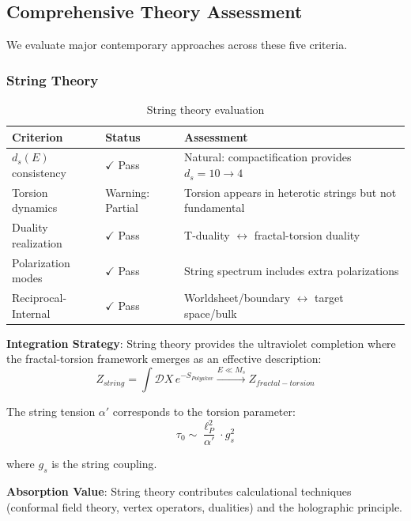 \subsection{Comprehensive Theory Assessment}

We evaluate major contemporary approaches across these five criteria.

\subsubsection{String Theory}

\begin{table}[h]
\centering
\begin{tabular}{p{3.5cm}p{2cm}p{6cm}}
\toprule
\textbf{Criterion} & \textbf{Status} & \textbf{Assessment} \\
\midrule
$d_s(E)$ consistency & $\checkmark$ Pass & Natural: compactification provides $d_s = 10 \to 4$ \\
Torsion dynamics & Warning: Partial & Torsion appears in heterotic strings but not fundamental \\
Duality realization & $\checkmark$ Pass & T-duality $\leftrightarrow$ fractal-torsion duality \\
Polarization modes & $\checkmark$ Pass & String spectrum includes extra polarizations \\
Reciprocal-Internal & $\checkmark$ Pass & Worldsheet/boundary $\leftrightarrow$ target space/bulk \\
\bottomrule
\end{tabular}
\caption{String theory evaluation}
\end{table}

\textbf{Integration Strategy}:
String theory provides the ultraviolet completion where the fractal-torsion framework emerges as an effective description:
\begin{equation}
    Z_{string} = \int \mathcal{D}X \, e^{-S_{Polyakov}} \xrightarrow{E \ll M_s} Z_{fractal-torsion}
\end{equation}

The string tension $\alpha'$ corresponds to the torsion parameter:
\begin{equation}
    \tau_0 \sim \frac{\ell_P^2}{\alpha'} \cdot g_s^2
\end{equation}

where $g_s$ is the string coupling.

\textbf{Absorption Value}: String theory contributes calculational techniques (conformal field theory, vertex operators, dualities) and the holographic principle.

